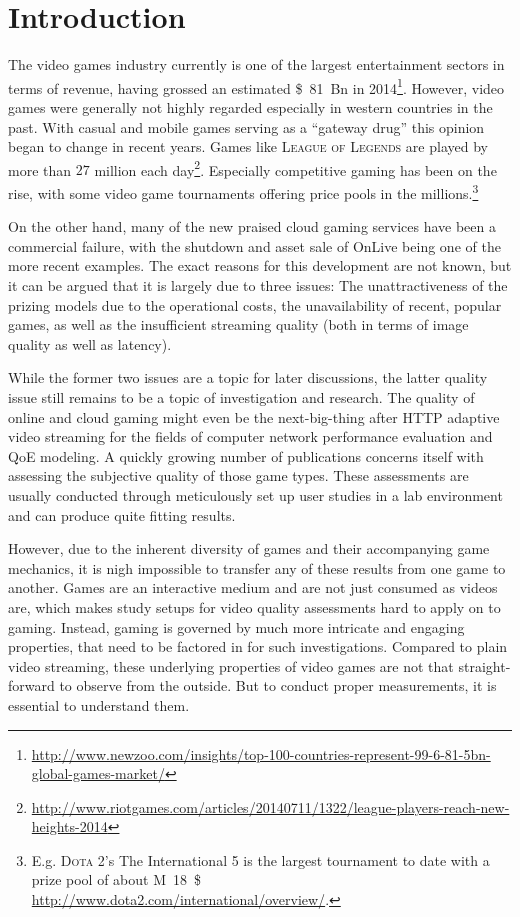 \section{Introduction}
\label{sec:introduction}


The video games industry currently is one of the largest entertainment sectors in terms of revenue, having grossed an estimated \SI{81}[\$]{Bn} in 2014\footnote{\url{http://www.newzoo.com/insights/top-100-countries-represent-99-6-81-5bn-global-games-market/}}. However, video games were generally not highly regarded especially in western countries in the past. With casual and mobile games serving as a ``gateway drug'' this opinion began to change in recent years. Games like \textsc{League of Legends} are played by more than $27$ million each day\footnote{\url{http://www.riotgames.com/articles/20140711/1322/league-players-reach-new-heights-2014}}. Especially competitive gaming has been on the rise, with some video game tournaments offering price pools in the millions.\footnote{E.g. \textsc{Dota 2}'s The International 5  is the largest tournament to date with a prize pool of about \SI{18}[M]{\$} \url{http://www.dota2.com/international/overview/}.}

On the other hand, many of the new praised cloud gaming services have been a commercial failure, with the shutdown and asset sale of OnLive being one of the more recent examples. The exact reasons for this development are not known, but it can be argued that it is largely due to three issues: The unattractiveness of the prizing models due to the operational costs, the unavailability of recent, popular games, as well as the insufficient streaming quality (both in terms of image quality as well as latency).

While the former two issues are a topic for later discussions, the latter quality issue still remains to be a topic of investigation and research. The quality of online and cloud gaming might even be the next-big-thing after \acrshort{HTTP} adaptive video streaming for the fields of computer network performance evaluation and \acrshort{QoE} modeling. A quickly growing number of publications concerns itself with assessing the subjective quality of those game types. These assessments are usually conducted through meticulously set up user studies in a lab environment and can produce quite fitting results.

However, due to the inherent diversity of games and their accompanying game mechanics, it is nigh impossible to transfer any of these results from one game to another. Games are an interactive medium and are not just consumed as videos are, which makes study setups for video quality assessments hard to apply on to gaming. Instead, gaming is governed by much more intricate and engaging properties, that need to be factored in for such investigations. Compared to plain video streaming, these underlying properties of video games are not that straight-forward to observe from the outside. But to conduct proper measurements, it is essential to understand them.

